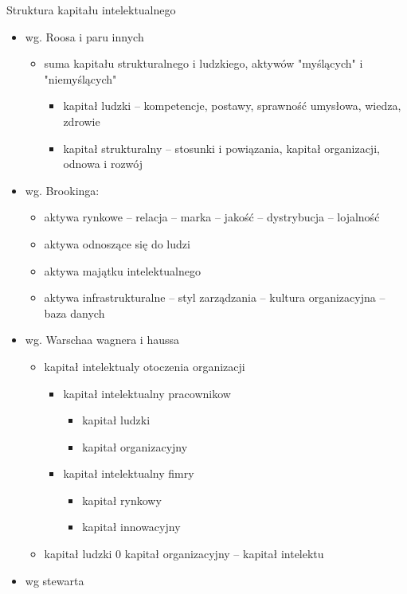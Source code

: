\documentclass[a4paper,10pt]{report}
\begin{document}
Struktura kapitału intelektualnego
\begin{itemize}
	\item wg. Roosa i paru innych
	\begin{itemize}
		\item suma kapitału strukturalnego i ludzkiego, aktywów "myślących" i "niemyślących"
		\begin{itemize}
			\item kapitał ludzki -- kompetencje, postawy, sprawność umysłowa, wiedza, zdrowie
			\item kapitał strukturalny -- stosunki i powiązania, kapitał organizacji, odnowa i rozwój
		\end{itemize}
	\end{itemize}
	\item wg. Brookinga:
	\begin{itemize}
		\item aktywa rynkowe -- relacja -- marka -- jakość -- dystrybucja -- lojalność
		\item aktywa odnoszące się do ludzi
		\item aktywa majątku intelektualnego
		\item aktywa infrastrukturalne -- styl zarządzania -- kultura organizacyjna -- baza danych
	\end{itemize}
	\item wg. Warschaa wagnera i haussa
	\begin{itemize}
		\item kapitał intelektualy otoczenia organizacji
		\begin{itemize}
			\item kapitał intelektualny pracownikow
			\begin{itemize}
				\item kapitał ludzki
				\item kapitał organizacyjny
			\end{itemize}
			\item kapitał intelektualny fimry
			\begin{itemize}
				\item kapitał rynkowy
				\item kapitał innowacyjny
			\end{itemize}
		\end{itemize}
		\item kapitał ludzki 0 kapitał organizacyjny -- kapitał intelektu
	\end{itemize}
	\item wg stewarta
	\begin{itemize}

\end{itemize}
\end{itemize}
\end{document}
